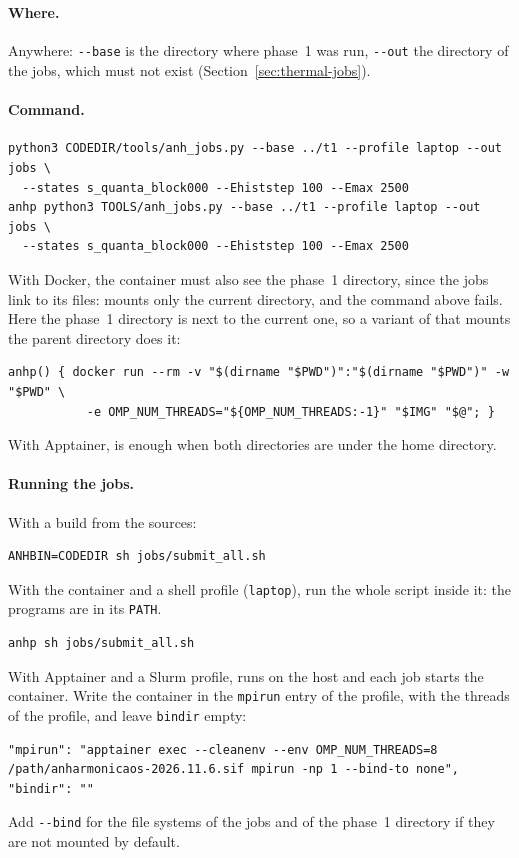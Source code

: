 \section{}\label{sec:run-jobs}

\paragraph{Where.} Anywhere: \texttt{-{}-base} is the directory where
phase~1 was run, \texttt{-{}-out} the directory of the jobs, which must not
exist (Section~\ref{sec:thermal-jobs}).

\paragraph{Command.}
\begin{lstlisting}
python3 CODEDIR/tools/anh_jobs.py --base ../t1 --profile laptop --out jobs \
  --states s_quanta_block000 --Ehiststep 100 --Emax 2500
anhp python3 TOOLS/anh_jobs.py --base ../t1 --profile laptop --out jobs \
  --states s_quanta_block000 --Ehiststep 100 --Emax 2500
\end{lstlisting}
With Docker, the container must also see the phase~1 directory, since the
jobs link to its files:  mounts only the current directory, and
the command above fails. Here the phase~1 directory is next to the current
one, so a variant of \prog{anh} that mounts the parent directory does it:
\begin{lstlisting}
anhp() { docker run --rm -v "$(dirname "$PWD")":"$(dirname "$PWD")" -w "$PWD" \
           -e OMP_NUM_THREADS="${OMP_NUM_THREADS:-1}" "$IMG" "$@"; }
\end{lstlisting}
With Apptainer, \prog{anh} is enough when both directories are under the
home directory.

\paragraph{Running the jobs.} With a build from the sources:
\begin{lstlisting}
ANHBIN=CODEDIR sh jobs/submit_all.sh
\end{lstlisting}
With the container and a shell profile (\texttt{laptop}), run the whole
script inside it: the programs are in its \texttt{PATH}.
\begin{lstlisting}
anhp sh jobs/submit_all.sh
\end{lstlisting}
With Apptainer and a Slurm profile,  runs on the
host and each job starts the container. Write the container in the
\texttt{mpirun} entry of the profile, with the threads of the profile,
and leave \texttt{bindir} empty:
\begin{lstlisting}
"mpirun": "apptainer exec --cleanenv --env OMP_NUM_THREADS=8 /path/anharmonicaos-2026.11.6.sif mpirun -np 1 --bind-to none",
"bindir": ""
\end{lstlisting}
Add \texttt{-{}-bind} for the file systems of the jobs and of the phase~1
directory if they are not mounted by default.

